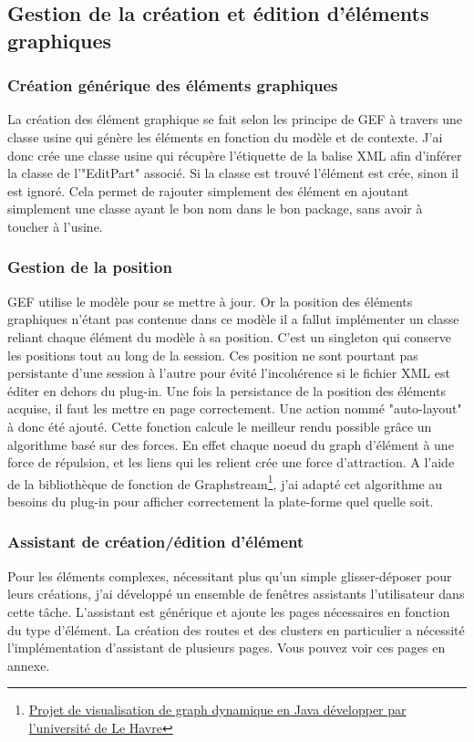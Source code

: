 \documentclass{article}
\begin{document}
    \subsection{Gestion de la création et édition d'éléments graphiques}
        \subsubsection{Création générique des éléments graphiques}
        La création des élément graphique se fait selon les principe de GEF à travers une classe usine qui génère les éléments en fonction du modèle et de contexte. J'ai donc crée une classe usine qui récupère l'étiquette de la balise XML afin d'inférer la classe de l'"EditPart" associé. Si la classe est trouvé l'élément est crée, sinon il est ignoré. Cela permet de rajouter simplement des élément en ajoutant simplement une classe ayant le bon nom dans le bon package, sans avoir à toucher à l'usine.
        \subsubsection{Gestion de la position}
		GEF utilise le modèle pour se mettre à jour. Or la position des éléments graphiques n'étant pas contenue dans ce modèle il a fallut implémenter un classe reliant chaque élément du modèle à sa position. C'est un singleton qui conserve les positions tout au long de la session. Ces position ne sont pourtant pas persistante d'une session à l'autre pour évité l'incohérence si le fichier XML est éditer en dehors du plug-in.
	    Une fois la persistance de la position des éléments acquise, il faut les mettre en page correctement. Une action  nommé "auto-layout" à donc été ajouté. Cette fonction calcule le meilleur rendu possible grâce un algorithme basé sur des forces. En effet chaque noeud du graph d'élément à une force de répulsion, et les liens qui les relient crée une force d'attraction. A l'aide de la bibliothèque de fonction de Graphstream\footnote{\href{http://graphstream-project.org}{Projet de visualisation de graph dynamique en Java développer par l'université de Le Havre}}, j'ai adapté cet algorithme au besoins du plug-in pour afficher correctement la plate-forme quel quelle soit.
        \subsubsection{Assistant de création/édition d'élément}
        Pour les éléments complexes, nécessitant plus qu'un simple glisser-déposer pour leurs créations, j'ai développé un ensemble de fenêtres assistants l'utilisateur dans cette tâche. L'assistant est générique et ajoute les pages nécessaires en fonction du type d'élément. La création des routes et des clusters en particulier a nécessité l'implémentation d'assistant de plusieurs pages. Vous pouvez voir ces pages en annexe.
\end{document}
